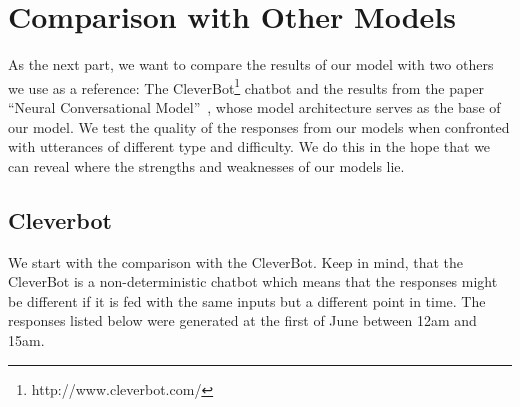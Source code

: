 \section{Comparison with Other Models}
As the next part, we want to compare the results of our model with two others we use as a reference: The CleverBot\footnote{http://www.cleverbot.com/} chatbot and the results from the paper ``Neural Conversational Model''~\cite{Vinyals:2015}, whose model architecture serves as the base of our model. We test the quality of the responses from our models when confronted with utterances of different type and difficulty. We do this in the hope that we can reveal where the strengths and weaknesses of our models lie.

\subsection{Cleverbot}
\label{results:comparison:cleverbot}
We start with the comparison with the CleverBot. Keep in mind, that the CleverBot is a non-deterministic chatbot which means that the responses might be different if it is fed with the same inputs but a different point in time. The responses listed below were generated at the first of June between 12am and 15am.


